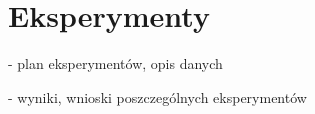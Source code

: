 \chapter{Eksperymenty}

- plan eksperymentów, opis danych

- wyniki, wnioski poszczególnych eksperymentów
